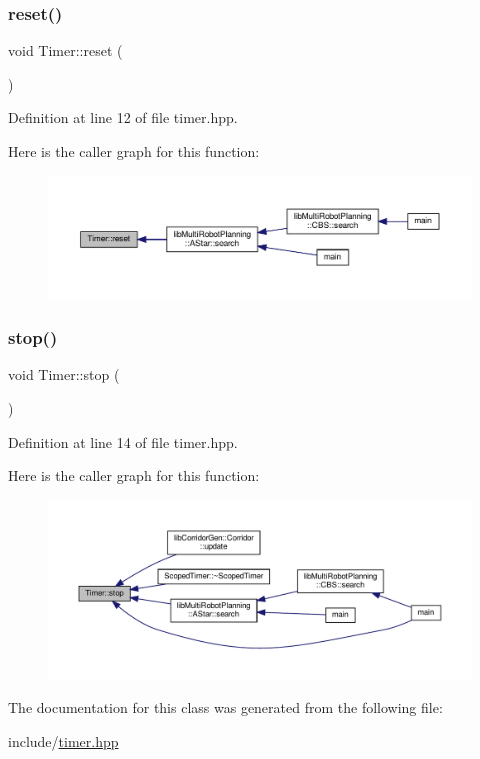 \subsubsection{\texorpdfstring{reset()}{reset()}}
{\footnotesize\ttfamily void Timer\+::reset (\begin{DoxyParamCaption}{ }\end{DoxyParamCaption})\hspace{0.3cm}{\ttfamily [inline]}}



Definition at line 12 of file timer.\+hpp.

Here is the caller graph for this function\+:
\nopagebreak
\begin{figure}[H]
\begin{center}
\leavevmode
\includegraphics[width=350pt]{class_timer_a9020542d73357a4eef512eefaf57524b_icgraph}
\end{center}
\end{figure}
\mbox{\label{class_timer_a63f0eb44b27402196590a03781515dba}} 
\subsubsection{\texorpdfstring{stop()}{stop()}}
{\footnotesize\ttfamily void Timer\+::stop (\begin{DoxyParamCaption}{ }\end{DoxyParamCaption})\hspace{0.3cm}{\ttfamily [inline]}}



Definition at line 14 of file timer.\+hpp.

Here is the caller graph for this function\+:
\nopagebreak
\begin{figure}[H]
\begin{center}
\leavevmode
\includegraphics[width=350pt]{class_timer_a63f0eb44b27402196590a03781515dba_icgraph}
\end{center}
\end{figure}


The documentation for this class was generated from the following file\+:\begin{DoxyCompactItemize}
\item 
include/\hyperlink{timer_8hpp}{timer.\+hpp}\end{DoxyCompactItemize}

